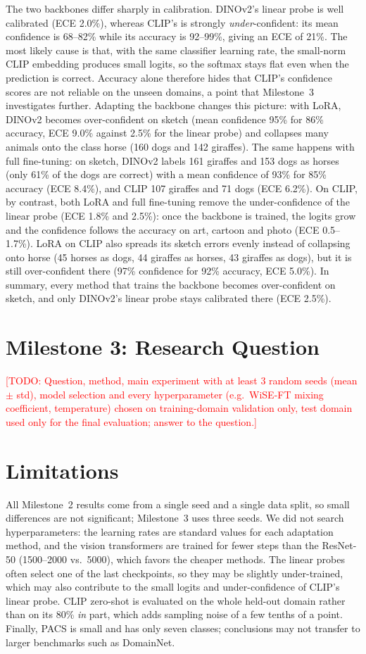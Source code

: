 \documentclass[conference]{IEEEtran}
\newcommand{\todo}[1]{\textcolor{red}{[TODO: #1]}}
\begin{document}
The two backbones differ sharply in calibration. DINOv2's linear probe is well calibrated (ECE 2.0\%), whereas CLIP's is strongly \emph{under}-confident: its mean confidence is 68--82\% while its accuracy is 92--99\%, giving an ECE of 21\%. The most likely cause is that, with the same classifier learning rate, the small-norm CLIP embedding produces small logits, so the softmax stays flat even when the prediction is correct. Accuracy alone therefore hides that CLIP's confidence scores are not reliable on the unseen domains, a point that Milestone~3 investigates further. Adapting the backbone changes this picture: with LoRA, DINOv2 becomes over-confident on sketch (mean confidence 95\% for 86\% accuracy, ECE 9.0\% against 2.5\% for the linear probe) and collapses many animals onto the class horse (160 dogs and 142 giraffes). The same happens with full fine-tuning: on sketch, DINOv2 labels 161 giraffes and 153 dogs as horses (only 61\% of the dogs are correct) with a mean confidence of 93\% for 85\% accuracy (ECE 8.4\%), and CLIP 107 giraffes and 71 dogs (ECE 6.2\%). On CLIP, by contrast, both LoRA and full fine-tuning remove the under-confidence of the linear probe (ECE 1.8\% and 2.5\%): once the backbone is trained, the logits grow and the confidence follows the accuracy on art, cartoon and photo (ECE 0.5--1.7\%). LoRA on CLIP also spreads its sketch errors evenly instead of collapsing onto horse (45 horses as dogs, 44 giraffes as horses, 43 giraffes as dogs), but it is still over-confident there (97\% confidence for 92\% accuracy, ECE 5.0\%). In summary, every method that trains the backbone becomes over-confident on sketch, and only DINOv2's linear probe stays calibrated there (ECE 2.5\%).

\section{Milestone 3: Research Question}\label{sec:m3}
\todo{Question, method, main experiment with at least 3 random seeds (mean $\pm$ std), model selection and every hyperparameter (e.g.\ WiSE-FT mixing coefficient, temperature) chosen on training-domain validation only, test domain used only for the final evaluation; answer to the question.}

\section{Limitations}
All Milestone~2 results come from a single seed and a single data split, so small differences are not significant; Milestone~3 uses three seeds. We did not search hyperparameters: the learning rates are standard values for each adaptation method, and the vision transformers are trained for fewer steps than the ResNet-50 (1500--2000 vs.\ 5000), which favors the cheaper methods. The linear probes often select one of the last checkpoints, so they may be slightly under-trained, which may also contribute to the small logits and under-confidence of CLIP's linear probe. CLIP zero-shot is evaluated on the whole held-out domain rather than on its 80\% \emph{in} part, which adds sampling noise of a few tenths of a point. Finally, PACS is small and has only seven classes; conclusions may not transfer to larger benchmarks such as DomainNet.
\end{document}
